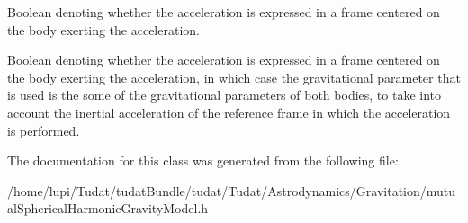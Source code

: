Boolean denoting whether the acceleration is expressed in a frame centered on the body exerting the acceleration. 

Boolean denoting whether the acceleration is expressed in a frame centered on the body exerting the acceleration, in which case the gravitational parameter that is used is the some of the gravitational parameters of both bodies, to take into account the inertial acceleration of the reference frame in which the acceleration is performed. 

The documentation for this class was generated from the following file\+:\begin{DoxyCompactItemize}
\item 
/home/lupi/\+Tudat/tudat\+Bundle/tudat/\+Tudat/\+Astrodynamics/\+Gravitation/mutual\+Spherical\+Harmonic\+Gravity\+Model.\+h\end{DoxyCompactItemize}
